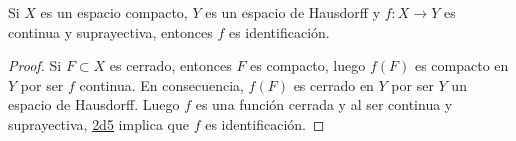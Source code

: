 

\begin{theorem}
Si $X$ es un espacio compacto, $Y$ es un espacio de Hausdorff y $f : X \longrightarrow Y$ es continua y suprayectiva, entonces $f$ es identificación.
\end{theorem}

\begin{proof}
Si $F \subset X$ es cerrado, entonces $F$ es compacto, luego $f(F)$ es compacto en $Y$ por ser $f$ continua. En consecuencia, $f(F)$ es cerrado en $Y$ por ser $Y$ un espacio de Hausdorff. Luego $f$ es una función cerrada y al ser continua y suprayectiva, \hyperref[card:2d5]{\textsf{2d5}} implica que $f$ es identificación.
\end{proof}
